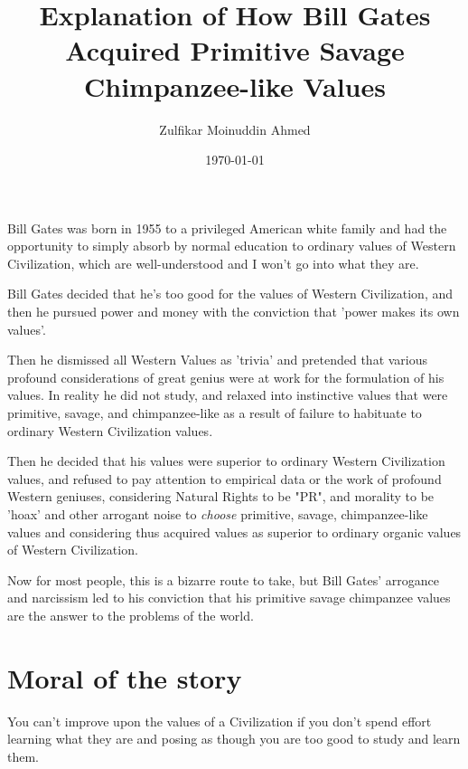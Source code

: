 \documentclass{amsart}
\title{Explanation of How Bill Gates Acquired Primitive Savage Chimpanzee-like Values}
\author{Zulfikar Moinuddin Ahmed}
\date{\today}
\begin{document}
\maketitle

Bill Gates was born in 1955 to a privileged American white family and had the opportunity to simply absorb by normal education to ordinary values of Western Civilization, which are well-understood and I won't go into what they are.  


Bill Gates decided that he's too good for the values of Western Civilization, and then he pursued power and money with the conviction that 'power makes its own values'.  

Then he dismissed all Western Values as 'trivia' and pretended that various profound considerations of great genius were at work for the formulation of his values.  In reality he did not study, and relaxed into instinctive values that were primitive, savage, and chimpanzee-like as a result of failure to habituate to ordinary Western Civilization values.  

Then he decided that his values were superior to ordinary Western Civilization values, and refused to pay attention to empirical data or the work of profound Western geniuses, considering Natural Rights to be "PR", and morality to be 'hoax' and other arrogant noise to {\em choose} primitive, savage, chimpanzee-like values and considering thus acquired values as superior to ordinary organic values of Western Civilization.  

Now for most people, this is a bizarre route to take, but Bill Gates' arrogance and narcissism led to his conviction that his primitive savage chimpanzee values are the answer to the problems of the world.  

\section{Moral of the story}
You can't improve upon the values of a Civilization if you don't spend effort learning what they are and posing as though you are too good to study and learn them.
\end{document}
